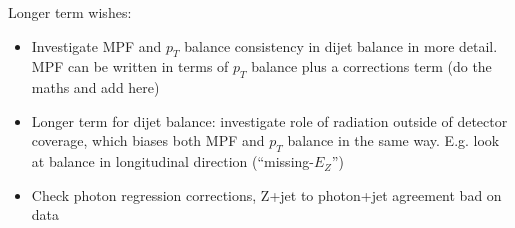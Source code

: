 \documentclass[landscape,10pt]{beamer} %
\begin{document}
Longer term wishes:
\begin{itemize}
\item Investigate MPF and $p_T$ balance consistency in dijet balance in more detail. MPF can be written in terms of $p_T$ balance plus a corrections term (do the maths and add here)
\item Longer term for dijet balance: investigate role of radiation outside of detector coverage, which biases both MPF and $p_T$ balance in the same way. E.g. look at balance in longitudinal direction (``missing-$E_Z$'')
\item Check photon regression corrections, Z+jet to photon+jet agreement bad on data
\end{itemize}
\end{document}
